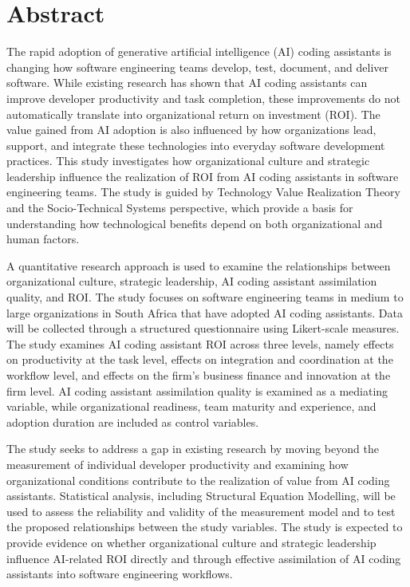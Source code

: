 \documentclass[11pt]{report}
\begin{document}
	
\maketitle

\chapter*{Abstract}

The rapid adoption of generative artificial intelligence (AI) coding assistants is changing how software engineering teams develop, test, document, and deliver software. While existing research has shown that AI coding assistants can improve developer productivity and task completion, these improvements do not automatically translate into organizational return on investment (ROI). The value gained from AI adoption is also influenced by how organizations lead, support, and integrate these technologies into everyday software development practices. This study investigates how organizational culture and strategic leadership influence the realization of ROI from AI coding assistants in software engineering teams. The study is guided by Technology Value Realization Theory and the Socio-Technical Systems perspective, which provide a basis for understanding how technological benefits depend on both organizational and human factors.

A quantitative research approach is used to examine the relationships between organizational culture, strategic leadership, AI coding assistant assimilation quality, and ROI. The study focuses on software engineering teams in medium to large organizations in South Africa that have adopted AI coding assistants. Data will be collected through a structured questionnaire using Likert-scale measures. The study examines AI coding assistant ROI across three levels, namely effects on productivity at the task level, effects on integration and coordination at the workflow level, and effects on the firm's business finance and innovation at the firm level. AI coding assistant assimilation quality is examined as a mediating variable, while organizational readiness, team maturity and experience, and adoption duration are included as control variables.

The study seeks to address a gap in existing research by moving beyond the measurement of individual developer productivity and examining how organizational conditions contribute to the realization of value from AI coding assistants. Statistical analysis, including Structural Equation Modelling, will be used to assess the reliability and validity of the measurement model and to test the proposed relationships between the study variables. The study is expected to provide evidence on whether organizational culture and strategic leadership influence AI-related ROI directly and through effective assimilation of AI coding assistants into software engineering workflows.
\end{document}
